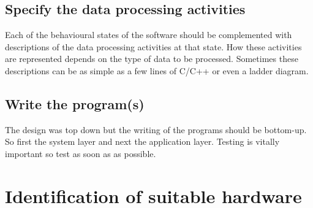 \documentclass[../main.tex]{subfiles}
\begin{document}
\subsection{Specify the data processing activities}
\label{sss:activities}
Each of the behavioural states of the software should be complemented with descriptions of the data processing activities at that state.
How these activities are represented depends on the type of data to be processed.
Sometimes these descriptions can be as simple as a few lines of C/C++ or even a ladder diagram.




\subsection{Write the program(s)}
\label{sss:write}
The design was top down but the writing of the programs should be bottom-up. So first the system layer and next the application layer. 
Testing is vitally important so test as soon as as possible.

\section{Identification of suitable hardware}
\end{document}
